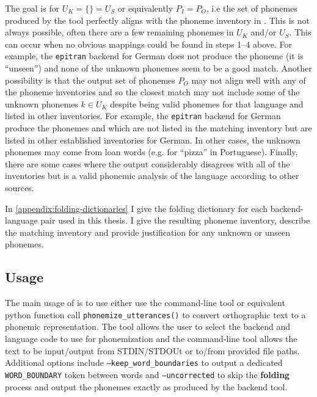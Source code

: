 The goal is for $U_K = \{\} = U_S$ or equivalently $P_I = P_O$, i.e the set of phonemes produced by the tool perfectly aligns with the phoneme inventory in \phoible. This is not always possible, often there are a few remaining phonemes in $U_K$ and/or $U_S$. This can occur when no obvious mappings could be found in steps 1--4 above. For example, the \texttt{epitran} backend for German does not produce the phoneme  (it is ``unseen'') and none of the unknown phonemes seem to be a good match. Another possibility is that the output set of phonemes $P_O$ may not align well with any of the \phoible phoneme inventories and so the closest match may not include some of the unknown phonemes $k \in U_K$ despite being valid phonemes for that language and listed in other inventories. For example, the \texttt{epitran} backend for German produce the phonemes  and  which are not listed in the matching inventory but are listed in other established inventories for German. In other cases, the unknown phonemes may come from loan words (e.g.  for ``pizza'' in Portuguese). Finally, there are some cases where the output considerably disagrees with all of the \phoible inventories but is a valid phonemic analysis of the language according to other sources.


In \cref{appendix:folding-dictionaries} I give the folding dictionary for each backend-language pair used in this thesis. I give the resulting phoneme inventory, describe the matching \phoible inventory and provide justification for any unknown or unseen phonemes.

\subsection{Usage}
\label{sec:dataset-usage}


The main usage of \corpusphonemizer is to use either use the command-line tool or equivalent python function call \texttt{phonemize\_utterances()} to convert orthographic text to a phonemic representation. The tool allows the user to select the backend and language code to use for phonemization and the command-line tool allows the text to be input/output from STDIN/STDOUt or to/from provided file paths. Additional options include \texttt{--keep\_word\_boundaries} to output a dedicated \texttt{WORD\_BOUNDARY} token between words and \texttt{--uncorrected} to skip the \textbf{folding} process and output the phonemes exactly as produced by the backend tool. 


